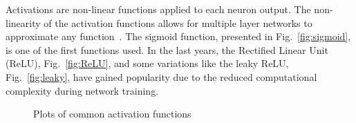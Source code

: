 Activations are non-linear functions applied to each neuron output. The non-linearity
of the activation functions allows for multiple layer networks to approximate
any function~\cite{mnielsen:nnanddl}. The sigmoid function, presented in
Fig.~\ref{fig:sigmoid}, is one of the first functions used. In the last years,
the Rectified Linear Unit (ReLU), Fig.~\ref{fig:ReLU}, and some variations like
the leaky ReLU, Fig.~\ref{fig:leaky}, have gained popularity due to the reduced
computational complexity during network training.

\begin{figure}[!htb]
	\begin{subfigmatrix}{3}
	\end{subfigmatrix}
	\caption{Plots of common activation functions}
	\label{fig:activation_plots}
\end{figure}

